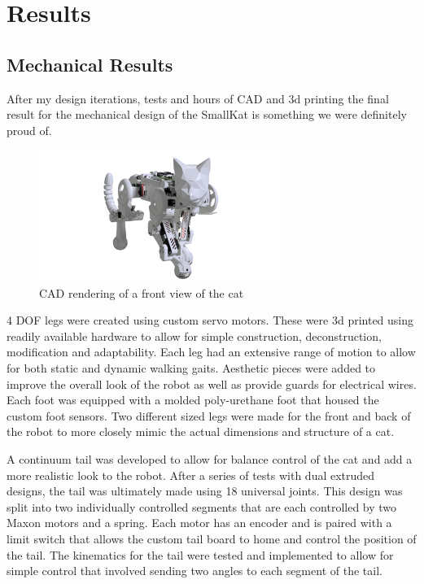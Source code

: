 \section{Results}
\subsection{Mechanical Results}
After my design iterations, tests and hours of CAD and 3d printing the final result for the mechanical design of the SmallKat is something we were definitely proud of.

  \begin{figure}[H]
                    \centering
                    \includegraphics[width=0.7\textwidth]{figures/SmallKatFrontView.png}
                    \caption{CAD rendering of a front view of the cat}
                    \label{SmallKatFrontView}
            \end{figure}  

4 DOF legs were created using custom servo motors. These were 3d printed using readily available hardware to allow for simple construction, deconstruction, modification and adaptability. Each leg had an extensive range of motion to allow for both static and dynamic walking gaits. Aesthetic pieces were added to improve the overall look of the robot as well as provide guards for electrical wires. Each foot was equipped with a molded poly-urethane foot that housed the custom foot sensors. Two different sized legs were made for the front and back of the robot to more closely mimic the actual dimensions and structure of a cat.

A continuum tail was developed to allow for balance control of the cat and add a more realistic look to the robot. After a series of tests with dual extruded designs, the tail was ultimately made using 18 universal joints. This design was split into two individually controlled segments that are each controlled by two Maxon motors and a spring. Each motor has an encoder and is paired with a limit switch that allows the custom tail board to home and control the position of the tail. The kinematics for the tail were tested and implemented to allow for simple control that involved sending two angles to each segment of the tail. 


